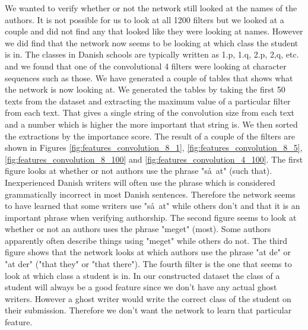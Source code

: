 We wanted to verify whether or not the network still looked at the names of the
authors. It is not possible for us to look at all 1200 filters but we looked
at a couple and did not find any that looked like they were looking at names.
However we did find that the network now seems to be looking at which class
the student is in. The classes in Danish schools are typically written as 1.p,
1.q, 2.p, 2,q, etc. and we found that one of the convolutional 4 filters were
looking at character sequences such as those. We have generated a couple of
tables that shows what the network is now looking at. We generated the tables by
taking the first 50 texts from the dataset and extracting the maximum value of a
particular filter from each text. That gives a single string of the convolution
size from each text and a number which is higher the more important that string
is. We then sorted the extractions by the importance score. The result of a
couple of the filters are shown in Figures \ref{fig:features_convolution_8_1},
\ref{fig:features_convolution_8_5}, \ref{fig:features_convolution_8_100} and
\ref{fig:features_convolution_4_100}. The first figure looks at whether or not
authors use the phrase "s\aa\ at" (such that). Inexperienced Danish writers will
often use the phrase which is considered grammatically incorrect in most Danish
sentences. Therefore the network seems to have learned that some writers use
"s\aa\ at" while others don't and that it is an important phrase when verifying
authorship. The second figure seems to look at whether or not an authors uses
the phrase "meget" (most). Some authors apparently often describe things using
"meget" while others do not. The third figure shows that the network looks at
which authors use the phrase "at de" or "at der" ("that they" or "that there").
The fourth filter is the one that seems to look at which class a student is in.
In our constructed dataset the class of a student will always be a good feature
since we don't have any actual ghost writers. However a ghost writer would write
the correct class of the student on their submission. Therefore we don't want
the network to learn that particular feature.

